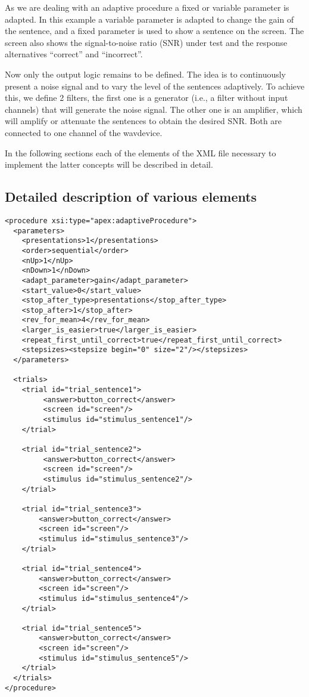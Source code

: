 As we are dealing with an adaptive procedure a fixed or variable
parameter is adapted. In this example a variable parameter is
adapted to change the gain of the sentence, and a fixed parameter
is used to show a sentence on the screen. The screen also shows
the signal-to-noise ratio (SNR) under test and the response
alternatives ``correct'' and ``incorrect''.

Now only the output logic remains to be defined. The idea is to
continuously present a noise signal and to vary the level of the
sentences adaptively. To achieve this, we define 2 filters, the
first one is a generator (i.e., a filter without input channels)
that will generate the noise signal. The other one is an
amplifier, which will amplify or attenuate the sentences to obtain
the desired SNR. Both are connected to one channel of the
wavdevice.

In the following sections each of the elements of the XML file
necessary to implement the latter concepts will be described in
detail.

\subsection{Detailed description of various elements}

\begin{lstlisting}
<procedure xsi:type="apex:adaptiveProcedure">
  <parameters>
    <presentations>1</presentations>
    <order>sequential</order>
    <nUp>1</nUp>
    <nDown>1</nDown>
    <adapt_parameter>gain</adapt_parameter>
    <start_value>0</start_value>
    <stop_after_type>presentations</stop_after_type>
    <stop_after>1</stop_after>
    <rev_for_mean>4</rev_for_mean>
    <larger_is_easier>true</larger_is_easier>
    <repeat_first_until_correct>true</repeat_first_until_correct>
    <stepsizes><stepsize begin="0" size="2"/></stepsizes>
  </parameters>

  <trials>
    <trial id="trial_sentence1">
         <answer>button_correct</answer>
         <screen id="screen"/>
         <stimulus id="stimulus_sentence1"/>
    </trial>

    <trial id="trial_sentence2">
         <answer>button_correct</answer>
         <screen id="screen"/>
         <stimulus id="stimulus_sentence2"/>
    </trial>

    <trial id="trial_sentence3">
        <answer>button_correct</answer>
        <screen id="screen"/>
        <stimulus id="stimulus_sentence3"/>
    </trial>

    <trial id="trial_sentence4">
        <answer>button_correct</answer>
        <screen id="screen"/>
        <stimulus id="stimulus_sentence4"/>
    </trial>

    <trial id="trial_sentence5">
        <answer>button_correct</answer>
        <screen id="screen"/>
        <stimulus id="stimulus_sentence5"/>
    </trial>
  </trials>
</procedure>
\end{lstlisting}


